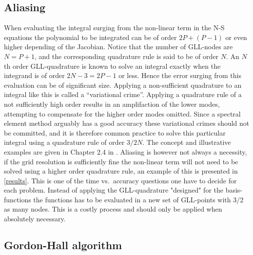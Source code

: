 

\subsection{Aliasing}

When evaluating the integral surging from the non-linear term in the N-S equations 
the polynomial to be integrated can be of order $2P+(P-1)$ or even higher depending
of the Jacobian. Notice that the number of GLL-nodes are $N=P+1$, and the corresponding
quadrature rule is said to be of order $N$. An $N$th order GLL-quadrature is known to 
solve an integral exactly when the integrand is of order $2N-3=2P-1$ or less.
Hence the error surging from this evaluation can be of significant size.
Applying a non-sufficient quadrature to an integral like this is called a ``variational
crime''. Applying a quadrature rule of a not sufficiently high order results in an 
amplifaction of the lower modes, attempting to compensate for the higher order modes omitted. 
Since a spectral element method arguably has a good accuracy these variational crimes should 
not be committed, and it is therefore common practice to solve this particular integral using a
quadrature rule of order $3/2N$. The concept and illustrative examples are given in Chapter 2.4 in 
\cite{Karniadakis}. Aliasing is however not always a necessity, if the grid resolution is 
sufficiently fine the non-linear term will not need to be solved using a higher order quadrature rule, 
an example of this is presented in \cref{results}.
This is one of the time vs.\ accuracy questions one have to decide for each problem. 
Instead of applying the GLL-quadrature "designed" for the basis-functions the functions
has to be evaluated in a new set of GLL-points with $3/2$ as many nodes. This is a costly 
process and should only be applied when absolutely necessary. 


\subsection{Gordon-Hall algorithm} \label{GH}

